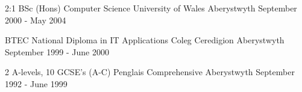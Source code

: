 

\begin{cventries}
    
  \cventrynobul
    {2:1 BSc (Hons) Computer Science} %
    {University of Wales} %
    {Aberystwyth} %
    {September 2000 - May 2004} %

  \cventrynobul
    {BTEC National Diploma in IT Applications} %
    {Coleg Ceredigion} %
    {Aberystwyth} %
    {September 1999 - June 2000} %

  \cventrynobul
    {2 A-levels, 10 GCSE's (A-C)} %
    {Penglais Comprehensive} %
    {Aberystwyth} %
    {September 1992 - June 1999} %

\end{cventries}
